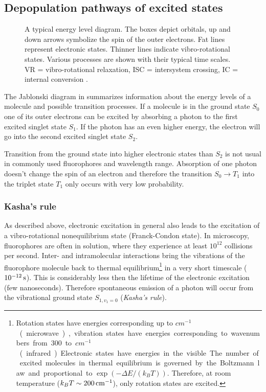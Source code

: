 \subsection{Depopulation pathways of excited states}
\begin{figure}[!hbt]
  \centering
  \def\svgscale{.8}
  {\small
  }
  \caption{A typical energy level diagram. The boxes depict orbitals,
    up and down arrows symbolize the spin of the outer electrons. Fat
    lines represent electronic states. Thinner lines indicate
    vibro-rotational states. Various processes are shown with their
    typical time scales. VR = vibro-rotational relaxation, ISC =
    intersystem crossing, IC = internal conversion \cite[inspired
    from][]{Haken2006}.}
  \label{fig:flu-level}
\end{figure}
The Jablonski diagram in  summarizes information
about the energy levels of a molecule and possible transition
processes. If a molecule is in the ground state $S_0$ one of its outer
electrons can be excited by absorbing a photon to the first excited
singlet state $S_1$.  If the photon has an even higher energy, the
electron will go into the second excited singlet state $S_2$.

Transition from the ground state into higher electronic states than
$S_2$ is not usual in commonly used fluorophores and wavelength range.
Absorption of one photon doesn't change the spin of an electron and
therefore the transition $S_0\rightarrow T_1$ into the triplet state
$T_1$ only occurs with very low probability.

\subsubsection{Kasha's rule}
As described above, electronic excitation in general also leads to the
excitation of a vibro-rotational nonequilibrium state (Franck-Condon
state). In microscopy, fluorophores are often in solution, where they
experience at least $10^{12}$ collisions per second. Inter- and
intramolecular interactions bring the vibrations of the fluorophore
molecule back to thermal equilibrium\footnote{Rotation states have
  energies corresponding up to \unit[100]{$cm^{-1}$} (microwave),
  vibration states have energies corresponding to wavenumbers from 300
  to \unit[3000]{$cm^{-1}$} (infrared). Electronic states have
  energies in the visible. The number of excited molecules in thermal
  equilibrium is governed by the Boltzmann law and proportional to
  $\exp(-\Delta E/(k_BT))$. Therefore, at room temperature ($k_B
  T\sim\unit[200]{cm^{-1}}$), only rotation states are excited. } in a
very short timescale ($\unit[10^{-12}]{s}$). This is considerably less
then the lifetime of the electronic excitation (few
nanoseconds). Therefore spontaneous emission of a photon will occur
from the vibrational ground state $S_{1,v_1=0}$ (\emph{Kasha's rule}).

